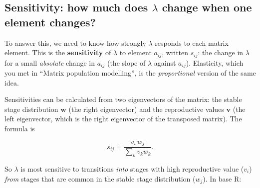 \documentclass[
  a4paper]{book}
\newenvironment{Shaded}{\begin{snugshade}}{\end{snugshade}}
\newcommand{\CommentTok}[1]{\textcolor[rgb]{0.56,0.35,0.01}{\textit{#1}}}
\newcommand{\ControlFlowTok}[1]{\textcolor[rgb]{0.13,0.29,0.53}{\textbf{#1}}}
\newcommand{\FunctionTok}[1]{\textcolor[rgb]{0.13,0.29,0.53}{\textbf{#1}}}
\newcommand{\NormalTok}[1]{#1}
\newcommand{\OtherTok}[1]{\textcolor[rgb]{0.56,0.35,0.01}{#1}}
\newcommand{\SpecialCharTok}[1]{\textcolor[rgb]{0.81,0.36,0.00}{\textbf{#1}}}
\begin{document}
\subsection{\texorpdfstring{Sensitivity: how much does \(\lambda\) change when one element changes?}{Sensitivity: how much does \textbackslash lambda change when one element changes?}}\label{sensitivity-how-much-does-lambda-change-when-one-element-changes}

To answer this, we need to know how strongly \(\lambda\) responds to each matrix element. This is the \textbf{sensitivity} of \(\lambda\) to element \(a_{ij}\), written \(s_{ij}\): the change in \(\lambda\) for a small \emph{absolute} change in \(a_{ij}\) (the slope of \(\lambda\) against \(a_{ij}\)). Elasticity, which you met in ``Matrix population modelling'', is the \emph{proportional} version of the same idea.

Sensitivities can be calculated from two eigenvectors of the matrix: the stable stage distribution \(\mathbf{w}\) (the right eigenvector) and the reproductive values \(\mathbf{v}\) (the left eigenvector, which is the right eigenvector of the transposed matrix). The formula is

\[
s_{ij} = \frac{v_i \, w_j}{\sum_k v_k w_k}.
\]

So \(\lambda\) is most sensitive to transitions \emph{into} stages with high reproductive value (\(v_i\)) \emph{from} stages that are common in the stable stage distribution (\(w_j\)). In base R:

\begin{Shaded}
\end{Shaded}
\end{document}
